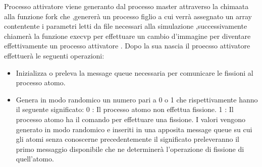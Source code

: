 Processo attivatore viene generanto dal processo master attraverso la chimaata alla funzione fork che ,genererà un processo figlio a cui verrà assegnato un array contentente i parametri letti da file necessari alla simulazione ,successivamente chiamerà la funzione execvp per effettuare un cambio d'immagine per diventare effettivamente un processo attivatore .
Dopo la sua nascia il proecsso attivatore effettuerà le seguenti operazioni: 
\begin{itemize}
    \item Inizializza o preleva la message queue necessaria per comunicare le fissioni al processo atomo.
    \item Genera in modo randomico un numero pari a 0 o 1 che rispettivamente hanno il seguente significato: 
        0 : Il processo atomo non effettua fissione. 
        1 : Il processo atomo ha il comando per effettuare una fissione. 
     I valori vengono generato in modo randomico e inseriti in una apposita message queue su cui gli atomi senza conoscerne precedentemente il significato preleveranno il primo messaggio disponibile che ne determinerà l'operazione di fissione di quell'atomo.
     
\end{itemize}
